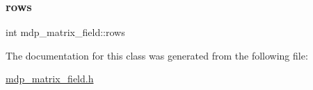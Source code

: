 \mbox{\label{classmdp__matrix__field_ac19f5807ad30e73c0362753a6b04c491}} 
\subsubsection{\texorpdfstring{rows}{rows}}
{\footnotesize\ttfamily int mdp\+\_\+matrix\+\_\+field\+::rows}



The documentation for this class was generated from the following file\+:\begin{DoxyCompactItemize}
\item 
\hyperlink{mdp__matrix__field_8h}{mdp\+\_\+matrix\+\_\+field.\+h}\end{DoxyCompactItemize}
